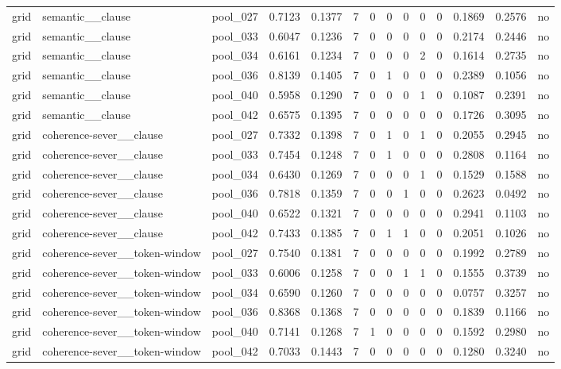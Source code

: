 \begin{table}[t]
{\begin{tabular}{llllllllllllll}
grid & semantic\_\_clause & pool\_027 & 0.7123 & 0.1377 & 7 & 0 & 0 & 0 & 0 & 0 & 0.1869 & 0.2576 & no \\
grid & semantic\_\_clause & pool\_033 & 0.6047 & 0.1236 & 7 & 0 & 0 & 0 & 0 & 0 & 0.2174 & 0.2446 & no \\
grid & semantic\_\_clause & pool\_034 & 0.6161 & 0.1234 & 7 & 0 & 0 & 0 & 2 & 0 & 0.1614 & 0.2735 & no \\
grid & semantic\_\_clause & pool\_036 & 0.8139 & 0.1405 & 7 & 0 & 1 & 0 & 0 & 0 & 0.2389 & 0.1056 & no \\
grid & semantic\_\_clause & pool\_040 & 0.5958 & 0.1290 & 7 & 0 & 0 & 0 & 1 & 0 & 0.1087 & 0.2391 & no \\
grid & semantic\_\_clause & pool\_042 & 0.6575 & 0.1395 & 7 & 0 & 0 & 0 & 0 & 0 & 0.1726 & 0.3095 & no \\
grid & coherence-sever\_\_clause & pool\_027 & 0.7332 & 0.1398 & 7 & 0 & 1 & 0 & 1 & 0 & 0.2055 & 0.2945 & no \\
grid & coherence-sever\_\_clause & pool\_033 & 0.7454 & 0.1248 & 7 & 0 & 1 & 0 & 0 & 0 & 0.2808 & 0.1164 & no \\
grid & coherence-sever\_\_clause & pool\_034 & 0.6430 & 0.1269 & 7 & 0 & 0 & 0 & 1 & 0 & 0.1529 & 0.1588 & no \\
grid & coherence-sever\_\_clause & pool\_036 & 0.7818 & 0.1359 & 7 & 0 & 0 & 1 & 0 & 0 & 0.2623 & 0.0492 & no \\
grid & coherence-sever\_\_clause & pool\_040 & 0.6522 & 0.1321 & 7 & 0 & 0 & 0 & 0 & 0 & 0.2941 & 0.1103 & no \\
grid & coherence-sever\_\_clause & pool\_042 & 0.7433 & 0.1385 & 7 & 0 & 1 & 1 & 0 & 0 & 0.2051 & 0.1026 & no \\
grid & coherence-sever\_\_token-window & pool\_027 & 0.7540 & 0.1381 & 7 & 0 & 0 & 0 & 0 & 0 & 0.1992 & 0.2789 & no \\
grid & coherence-sever\_\_token-window & pool\_033 & 0.6006 & 0.1258 & 7 & 0 & 0 & 1 & 1 & 0 & 0.1555 & 0.3739 & no \\
grid & coherence-sever\_\_token-window & pool\_034 & 0.6590 & 0.1260 & 7 & 0 & 0 & 0 & 0 & 0 & 0.0757 & 0.3257 & no \\
grid & coherence-sever\_\_token-window & pool\_036 & 0.8368 & 0.1368 & 7 & 0 & 0 & 0 & 0 & 0 & 0.1839 & 0.1166 & no \\
grid & coherence-sever\_\_token-window & pool\_040 & 0.7141 & 0.1268 & 7 & 1 & 0 & 0 & 0 & 0 & 0.1592 & 0.2980 & no \\
grid & coherence-sever\_\_token-window & pool\_042 & 0.7033 & 0.1443 & 7 & 0 & 0 & 0 & 0 & 0 & 0.1280 & 0.3240 & no \\

\end{tabular}}
\end{table}
